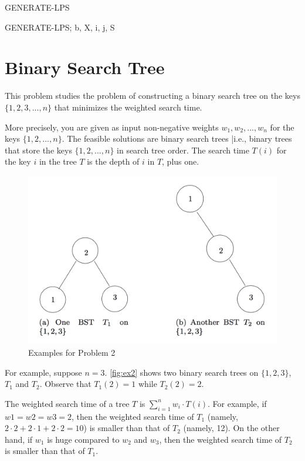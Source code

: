 \documentclass{article}
\begin{document}
\begin{algorithm}[H]
   \caption{GENERATE-LPS}
   GENERATE-LPS; b, X, i, j, S\\
  \end{algorithm} 
  

\section{Binary Search Tree}

This problem studies the problem of constructing a binary search tree on the keys $\{1, 2, 3, ..., n\}$ that minimizes the weighted search time.

More precisely, you are given as input non-negative weights $w_1, w_2, ..., w_n$ for the keys $\{1, 2, ..., n\}$. The feasible solutions are binary search trees |i.e., binary trees that store the keys $\{1, 2, ..., n\}$ in search tree
order. The search time $T(i)$ for the key $i$ in the tree $T$ is the depth of $i$ in $T$, plus one.


\begin{figure}[h]
  \centering
    \includegraphics[width=.5\textwidth]{ex22.png}
  \caption{Examples for Problem 2}
  \label{fig:ex2}
\end{figure}

For example, suppose $n=3$. \autoref{fig:ex2} shows two binary search trees on $\{1, 2, 3\}$, $T_1$ and $T_2$. Observe that $T_1(2)=1$ while $T_2(2)=2$.

The weighted search time of a tree $T$ is $\sum_{i=1}^n w_i \cdot T(i)$. For example, if $w1 = w2 = w3 = 2$, then the weighted search time of $T_1$ (namely, $2 \cdot 2 + 2 \cdot 1 + 2 \cdot 2 = 10$) is smaller than that of $T_2$ (namely, 12). On the other hand, if $w_1$ is huge compared to $w_2$ and $w_3$, then the weighted search time of $T_2$ is smaller than that of $T_1$.\\
\end{document}
